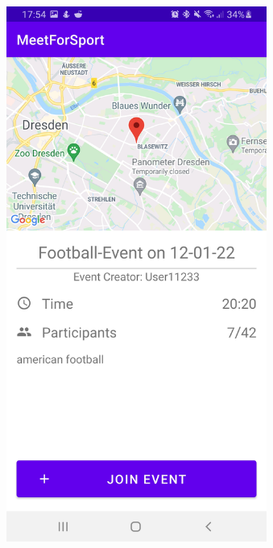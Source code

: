\documentclass[aspectratio=169]{beamer}
\begin{document}
\begin{frame}
\begin{columns}
\begin{figure}
			\end{figure}
			 \begin{figure}
				\centering
				\includegraphics[width=1\textwidth]{media/Information.jpg}
			\end{figure}
		\end{columns}
	\end{frame}
\end{document}
